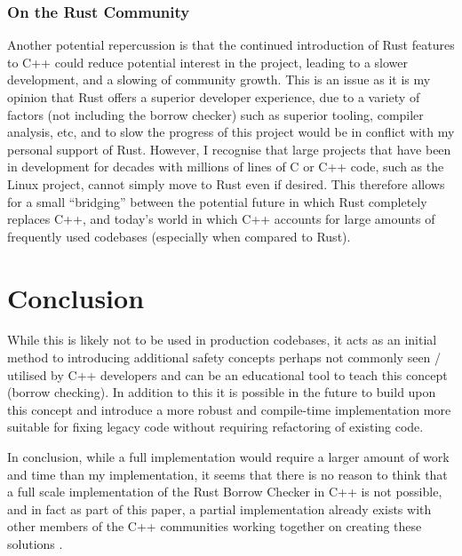 \documentclass[a4paper]{article}
\begin{document}
    \subsubsection{On the Rust Community}
    Another potential repercussion is that the continued introduction of Rust features to C++ could reduce potential interest in the project, leading to a slower development, and a slowing of community growth. This is an issue as it is my opinion that Rust offers a superior developer experience, due to a variety of factors (not including the borrow checker) such as superior tooling, compiler analysis, etc, and to slow the progress of this project would be in conflict with my personal support of Rust. However, I recognise that large projects that have been in development for decades with millions of lines of C or C++ code, such as the Linux project, cannot simply move to Rust even if desired. This therefore allows for a small ``bridging'' between the potential future in which Rust completely replaces C++, and today's world in which C++ accounts for large amounts of frequently used codebases (especially when compared to Rust).
\section{Conclusion}
While this is likely not to be used in production codebases, it acts as an initial method to introducing additional safety concepts perhaps not commonly seen / utilised by C++ developers and can be an educational tool to teach this concept (borrow checking). In addition to this it is possible in the future to build upon this concept and introduce a more robust and compile-time implementation more suitable for fixing legacy code without requiring refactoring of existing code.

In conclusion, while a full implementation would require a larger amount of work and time than my implementation, it seems that there is no reason to think that a full scale implementation of the Rust Borrow Checker in C++ is not possible, and in fact as part of this paper, a partial implementation already exists with other members of the C++ communities working together on creating these solutions \parencite{lifetime-annotations-cpp}.

\newpage

\printbibliography[title=Bibliography, heading=bibintoc]
\end{document}
